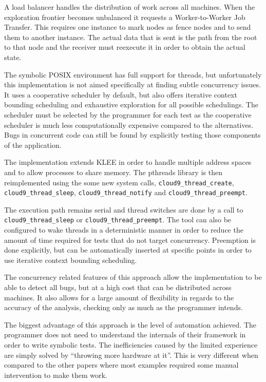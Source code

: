\documentclass[10pt]{llncs}
\begin{document}
A load balancer handles the distribution of work across all machines. When the exploration frontier becomes unbalanced it requests a Worker-to-Worker Job Transfer. This requires one instance to mark nodes as fence nodes and to send them to another instance. The actual data that is sent is the path from the root to that node and the receiver must reexecute it in order to obtain the actual state.

The symbolic POSIX environment has full support for threads, but unfortunately this implementation is not aimed specifically at finding subtle concurrency issues. It uses a cooperative scheduler by default, but also offers iterative context bounding scheduling \cite{Musuvathi} and exhaustive exploration for all possible schedulings. The scheduler must be selected by the programmer for each test as the cooperative scheduler is much less computationally expensive compared to the alternatives. Bugs in concurrent code can still be found by explicitly testing those components of the application.

The implementation extends KLEE in order to handle multiple address spaces and to allow processes to share memory. The pthreads library is then reimplemented using the some new system calls, \texttt{cloud9\_thread\_create}, \texttt{cloud9\_thread\_sleep}, \texttt{cloud9\_thread\_notify} and \texttt{cloud9\_thread\_preempt}.

The execution path remains serial and thread switches are done by a call to \texttt{cloud9\_thread\_sleep} or \texttt{cloud9\_thread\_preempt}. The tool can also be configured to wake threads in a deterministic manner in order to reduce the amount of time required for tests that do not target concurrency. Preemption is done explicitly, but can be automatically inserted at specific points in order to use iterative context bounding scheduling.

The concurrency related features of this approach allow the implementation to be able to detect all bugs, but at a high cost that can be distributed across machines. It also allows for a large amount of flexibility in regards to the accuracy of the analysis, checking only as much as the programmer intends.

The biggest advantage of this approach is the level of automation achieved. The programmer does not need to understand the internals of their framework in order to write symbolic tests. The inefficiencies caused by the limited experience are simply solved by ``throwing more hardware at it''. This is very different when compared to the other papers where most examples required some manual intervention to make them work.
\end{document}

